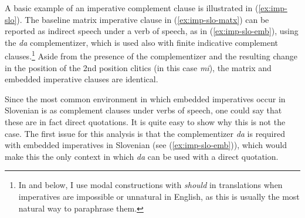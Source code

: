 \documentclass[output=paper,colorlinks,citecolor=brown]{langscibook}
\begin{document}
A basic example of an imperative complement clause is illustrated in (\ref{ex:imp-slo}). The baseline matrix imperative clause in (\ref{ex:imp-slo-matx}) can be reported as indirect speech under a verb of speech, as in (\ref{ex:imp-slo-emb}), using the \emph{da} complementizer, which is used also with finite indicative complement clauses.\footnote{In  and below, I use modal constructions with \emph{should} in translations when imperatives are impossible or unnatural in English, as this is usually the most natural way to paraphrase them.} Aside from the presence of the complementizer and the resulting change in the position of the 2nd position clitics (in this case \emph{mi}), the matrix and embedded imperative clauses are identical.%
\ea \label{ex:imp-slo}
\z\z 
{} %

\noindent Since the most common environment in which embedded imperatives occur in Slovenian is as complement clauses under verbs of speech, one could say that these are in fact direct quotations. It is quite easy to show why this is not the case. The first issue for this analysis is that the complementizer \emph{da} is required with embedded imperatives in Slovenian (see (\ref{ex:imp-slo-emb})), which would make this the only context in which \emph{da} can be used with a direct quotation. 
\end{document}
